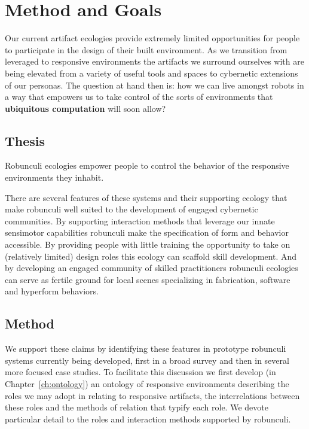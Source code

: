 \section{Method and Goals}
%
Our current artifact ecologies provide extremely limited opportunities for people to participate in the design of their built environment. 
As we transition from leveraged to responsive environments the artifacts we surround ourselves with are being elevated from a variety of useful tools and spaces to cybernetic extensions of our personas. 
The question at hand then is: how we can live amongst robots in a way that empowers us to take control of the sorts of environments that \textbf{ubiquitous computation} \citep{weiser_1999} will soon allow?

\subsection{Thesis}
%
\begin{em}
Robunculi ecologies empower people to control the behavior of the responsive environments they inhabit.
\end{em}

There are several features of these systems and their supporting ecology that make robunculi well suited to the development of engaged cybernetic communities. 
By supporting interaction methods that leverage our innate sensimotor capabilities robunculi make the specification of form and behavior accessible. By providing people with little training the opportunity to take on (relatively limited) design roles this ecology can scaffold skill development. 
And by developing an engaged community of skilled practitioners robunculi ecologies can serve as fertile ground for local scenes specializing in fabrication, software and hyperform behaviors.

\subsection{Method}
%
We support these claims by identifying these features in prototype robunculi systems currently being developed, first in a broad survey and then in several more focused case studies.
To facilitate this discussion we first develop (in Chapter~\ref{ch:ontology}) an ontology of responsive environments describing the roles we may adopt in relating to responsive artifacts, the interrelations between these roles and the methods of relation that typify each role. 
We devote particular detail to the roles and interaction methods supported by robunculi.

